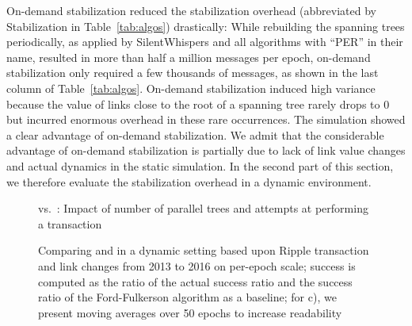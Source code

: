 On-demand stabilization reduced the stabilization overhead (abbreviated by Stabilization in Table~\ref{tab:algos})
drastically: While rebuilding the spanning trees periodically, as applied by SilentWhispers and all algorithms with ``PER'' in their name, resulted in more than half a million messages per epoch, on-demand stabilization only required a few thousands of messages,
as shown in the last column of Table~\ref{tab:algos}. 
On-demand stabilization induced high variance because the value of links close to the root of a spanning tree rarely drops to 0 but incurred enormous overhead in these rare occurrences. 
The simulation showed a clear advantage of on-demand stabilization. 
We admit that the considerable advantage of on-demand stabilization is partially due to lack of link value changes and actual dynamics in the static simulation. In the second part of this section, we therefore evaluate the stabilization overhead in a dynamic environment.
 

\begin{figure*}[t]
\centering
{}
\caption{\cnsysname vs.\ \oursys: Impact of number of parallel trees and attempts at performing a transaction}
\label{fig:parameter}
\vspace{-2em}
\end{figure*}

\begin{figure*}[t]
\centering
{}
\caption{Comparing \oursys and \cnsysname in a dynamic setting based upon Ripple transaction and link changes from 2013 to 2016 on per-epoch scale; success is computed as the ratio of the actual success ratio and the success ratio of the Ford-Fulkerson algorithm as a baseline; for c),  we present moving averages over 50 epochs to increase readability}
\label{fig:dynamic}
\vspace{-1em}
\end{figure*}

